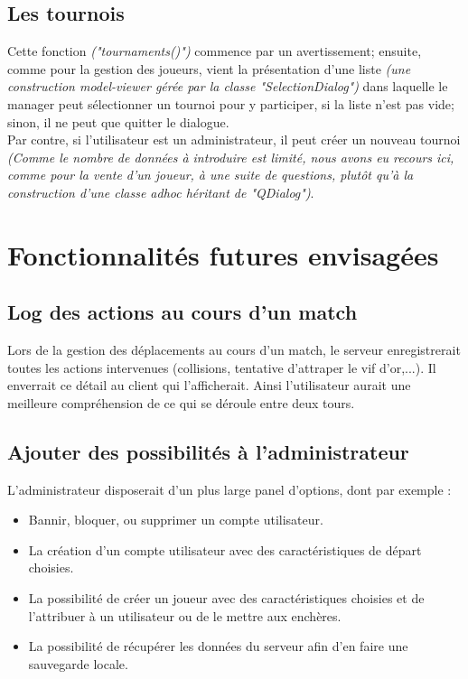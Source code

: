 \documentclass[a4paper,titlepage]{scrreprt}
\begin{document}
\subsection{Les tournois}
Cette fonction \emph{("tournaments()")} commence par un avertissement;
ensuite, comme pour la gestion des joueurs, vient la présentation d'une liste 
\emph{(une construction model-viewer gérée par la classe "SelectionDialog")}
dans laquelle le manager peut sélectionner un tournoi pour y participer,
si la liste n'est pas vide; sinon, il ne peut que quitter le dialogue.\\
Par contre, si l'utilisateur est un administrateur, il peut créer un nouveau tournoi
\emph{(Comme le nombre de données à introduire est limité,
nous avons eu recours ici, comme pour la vente d'un joueur, à une suite de questions,
plutôt qu'à la construction d'une classe adhoc héritant de "QDialog")}.

\section{Fonctionnalités futures envisagées}
  \subsection{Log des actions au cours d'un match}
    Lors de la gestion des déplacements au cours d'un match, le serveur enregistrerait 
    toutes les actions intervenues (collisions, tentative d'attraper le vif d'or,...).
    Il enverrait ce détail au client qui l'afficherait. Ainsi l'utilisateur aurait une
    meilleure compréhension de ce qui se déroule entre deux tours.
  \subsection{Ajouter des possibilités à l'administrateur}
    L'administrateur disposerait d'un plus large panel d'options, dont par exemple :
    \begin{itemize}
      \item Bannir, bloquer, ou supprimer un compte utilisateur.
      \item La création d'un compte utilisateur avec des caractéristiques de départ choisies.
      \item La possibilité de créer un joueur avec des caractéristiques choisies 
        et de l'attribuer à un utilisateur ou de le mettre aux enchères.
      \item La possibilité de récupérer les données du serveur afin d'en faire une sauvegarde locale.
    \end{itemize}
\end{document}
